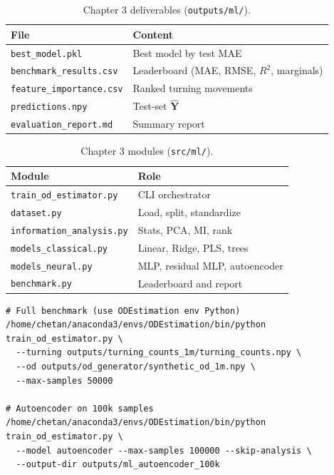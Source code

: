 \documentclass[11pt,a4paper]{report}
\newcommand{\mathbfY}{\mathbf{Y}}
\begin{document}
\begin{table}[ht]
\centering
\caption{Chapter 3 deliverables (\texttt{outputs/ml/}).}
\label{tab:outputs3}
\begin{tabular}{@{}ll@{}}
\toprule
\textbf{File} & \textbf{Content} \\
\midrule
\texttt{best\_model.pkl} & Best model by test MAE \\
\texttt{benchmark\_results.csv} & Leaderboard (MAE, RMSE, $R^2$, marginals) \\
\texttt{feature\_importance.csv} & Ranked turning movements \\
\texttt{predictions.npy} & Test-set $\hat{\mathbfY}$ \\
\texttt{evaluation\_report.md} & Summary report \\
\bottomrule
\end{tabular}
\end{table}

\begin{table}[ht]
\centering
\caption{Chapter 3 modules (\texttt{src/ml/}).}
\label{tab:impl3}
\small
\begin{tabular}{@{}ll@{}}
\toprule
\textbf{Module} & \textbf{Role} \\
\midrule
\texttt{train\_od\_estimator.py} & CLI orchestrator \\
\texttt{dataset.py} & Load, split, standardize \\
\texttt{information\_analysis.py} & Stats, PCA, MI, rank \\
\texttt{models\_classical.py} & Linear, Ridge, PLS, trees \\
\texttt{models\_neural.py} & MLP, residual MLP, autoencoder \\
\texttt{benchmark.py} & Leaderboard and report \\
\bottomrule
\end{tabular}
\end{table}

\begin{verbatim}
# Full benchmark (use ODEstimation env Python)
/home/chetan/anaconda3/envs/ODEstimation/bin/python train_od_estimator.py \
  --turning outputs/turning_counts_1m/turning_counts.npy \
  --od outputs/od_generator/synthetic_od_1m.npy \
  --max-samples 50000

# Autoencoder on 100k samples
/home/chetan/anaconda3/envs/ODEstimation/bin/python train_od_estimator.py \
  --model autoencoder --max-samples 100000 --skip-analysis \
  --output-dir outputs/ml_autoencoder_100k
\end{verbatim}
\end{document}
